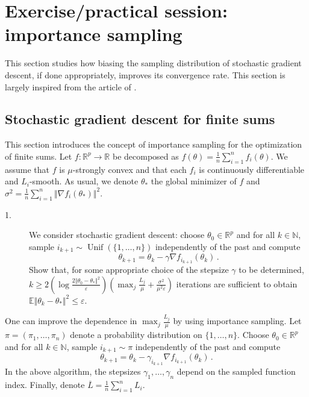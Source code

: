 \documentclass[11pt,reqno]{article}
\DeclareMathOperator{\Unif}{Unif}
\newcommand{\N}{\mathbb{N}}
\newcommand{\E}{\mathbb{E}}
\newcommand{\R}{\mathbb{R}}
\renewcommand{\leq}{\leqslant}
\renewcommand{\geq}{\geqslant}
\numberwithin{equation}{section}
\theoremstyle{plain}
\theoremstyle{definition}
\theoremstyle{remark}
\begin{document}
\section{Exercise/practical session: importance sampling}
\label{sec:importance-sampling}

This section studies how biasing the sampling distribution of stochastic gradient descent, if done appropriately, improves its convergence rate. This section is largely inspired from the article of \cite{needell2014stochastic}.

\subsection{Stochastic gradient descent for finite sums}

This section introduces the concept of importance sampling for the optimization of finite sums. Let $f:\R^p \to \R$ be decomposed as $f(\theta) = \frac{1}{n} \sum_{i=1}^{n} f_i(\theta)$. We assume that $f$ is $\mu$-strongly convex and that each $f_i$ is continuously differentiable and $L_i$-smooth. As usual, we denote $\theta_*$ the global minimizer of $f$ and $\sigma^2 = \frac{1}{n } \sum_{i=1}^{n } \Vert \nabla f_i(\theta_*) \Vert^2$. 

\begin{description}
	\item[1.] We consider stochastic gradient descent: choose $\theta_0 \in \R^p$ and for all $k\in \N$, sample $i_{k+1} \sim \Unif(\{1,\dots, n\})$ independently of the past and compute 
	\begin{equation*}
		\theta_{k+1} = \theta_k - \gamma \nabla f_{i_{k+1}}(\theta_k) \, . 
	\end{equation*}
	Show that, for some appropriate choice of the stepsize $\gamma$ to be determined, $k \geq 2\left(\log \frac{2\Vert \theta_0 - \theta_* \Vert^2}{\varepsilon}\right) \left(\max_j \frac{L_j}{\mu} + \frac{\sigma^2}{\mu^2 \varepsilon}\right)$ iterations are sufficient to obtain $\E\Vert \theta_k - \theta_* \Vert^2 \leq \varepsilon$.
\end{description}
One can improve the dependence in $\max_j \frac{L_j}{\mu}$ by using importance sampling. Let $\pi = (\pi_1, \dots, \pi_n)$ denote a probability distribution on $\{1, \dots, n\}$. Choose $\theta_0 \in \R^p$ and for all $k \in \N$, sample $i_{k+1} \sim \pi$ independently of the past and compute
\begin{equation*}
	\theta_{k+1} = \theta_k - \gamma_{i_{k+1}} \nabla f_{i_{k+1}}(\theta_k) \, .
\end{equation*}
In the above algorithm, the stepsizes $\gamma_1, \dots, \gamma_n$ depend on the sampled function index. Finally, denote $\overline{L} = \frac{1}{n} \sum_{i=1}^{n} L_i$. 
\end{document}
